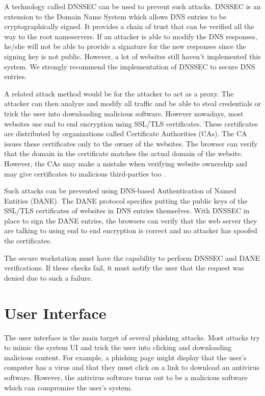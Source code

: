 A technology called DNSSEC can be used to prevent such attacks. DNSSEC is an extension to the Domain Name System which allows DNS entries to be cryptographically signed. It provides a chain of trust that can be verified all the way to the root nameservers. If an attacker is able to modify the DNS responses, he/she will not be able to provide a signature for the new responses since the signing key is not public. However, a lot of websites still haven't implemented this system. We strongly recommend the implementation of DNSSEC to secure DNS entries.

A related attack method would be for the attacker to act as a proxy. The attacker can then analyze and modify all traffic and be able to steal credentials or trick the user into downloading malicious software. However nowadays, most websites use end to end encryption using SSL/TLS certificates. These certificates are distributed by organizations called Certificate Authorities (CAs). The CA issues these certificates only to the owner of the websites. The browser can verify that the domain in the certificate matches the actual domain of the website. However, the CAs may make a mistake when verifying website ownership and may give certificates to malicious third-parties too \cite{chinese-ca}.

Such attacks can be prevented using DNS-based Authentication of Named Entities (DANE). The DANE protocol specifies putting the public keys of the SSL/TLS certificates of websites in DNS entries themselves. With DNSSEC in place to sign the DANE entries, the browsers can verify that the web server they are talking to using end to end encryption is correct and no attacker has spoofed the certificates.

The secure workstation must have the capability to perform DNSSEC and DANE verifications. If these checks fail, it must notify the user that the request was denied due to such a failure.

\section{User Interface} \label{userinterface}

The user interface is the main target of several phishing attacks. Most attacks try to mimic the system UI and trick the user into clicking and downloading malicious content. For example, a phishing page might display that the user's computer has a virus and that they must click on a link to download an antivirus software. However, the antivirus software turns out to be a malicious software which can compromise the user's system.

